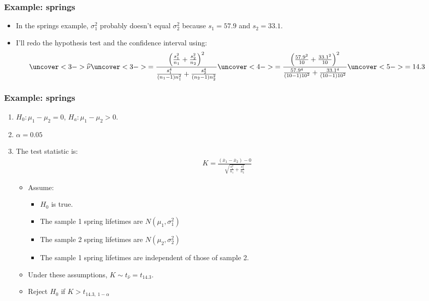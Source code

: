 \documentclass[handout]{beamer}\usepackage{graphicx, color}
\providecommand{\ov}[1]{\overline{#1}}
\providecommand{\wh}[1]{\widehat{#1}}
\numberwithin{equation}{section}
\begin{document}
\begin{frame}
\frametitle{Example: springs}
\begin{itemize}
\item In the springs example, $\sigma_1^2$ probably doesn't equal $\sigma_2^2$ because $s_1 = 57.9$ and $s_2 = 33.1$.
\pause \item I'll redo the hypothesis test and the confidence interval using: 
\begin{align*}
\uncover<3->{\wh{\nu}} \uncover<3->{= \frac{\left (\frac{s_1^2}{n_1} + \frac{s_2^2}{n_2} \right )^2}{\frac{s_1^4}{(n_1 - 1)n_1^2} + \frac{s_2^4}{(n_2 - 1)n_2^2}}} \uncover<4->{ = \frac{\left (\frac{57.9^2}{10} + \frac{33.1^2}{10} \right )^2}{\frac{57.9^4}{(10 - 1)10^2} + \frac{33.1^4}{(10 - 1)10^2}}} \uncover<5->{ =14.3}
\end{align*}
\end{itemize}
\end{frame}



\begin{frame}
\frametitle{Example: springs}
\begin{enumerate}[1. ]
\item $H_0:  \mu_1 - \mu_2 = 0$, $H_a: \mu_1 - \mu_2 > 0$.
\pause \item $\alpha = 0.05$
\pause \item The test statistic is:
\pause \begin{align*}
K = \frac{(\ov{x}_1 - \ov{x}_2) - 0}{ \sqrt{\frac{s_1^2}{n_1} + \frac{s_2^2}{n_2}}} 
\end{align*}
\begin{itemize}
\pause \item Assume:
\begin{itemize}
\pause \item $H_0$ is true.
\pause \item The sample 1 spring lifetimes are $N(\mu_1, \sigma^2_1)$
\pause \item The sample 2 spring lifetimes are $N(\mu_2, \sigma^2_2)$
\pause \item The sample 1 spring lifetimes are independent of those of sample 2.
\end{itemize}
\pause \item Under these assumptions, $K \sim t_{\wh{\nu}} = t_{14.3}$.
\pause \item Reject $H_0$ if $K > t_{14.3, \ 1 - \alpha}$
\end{itemize}
\setcounter{saveenum}{\value{enumi}}

\end{enumerate}
\end{frame}
\end{document}
